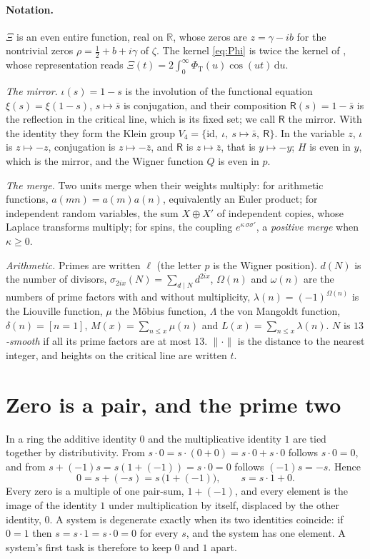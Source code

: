 \documentclass[11pt]{article}
\theoremstyle{definition}\newtheorem{definition}[theorem]{Definition}
\theoremstyle{remark}\newtheorem{remark}[theorem]{Remark}
\newcommand{\R}{\mathbb R}\newcommand{\C}{\mathbb C}\newcommand{\N}{\mathbb N}
\newcommand{\dd}{\,\mathrm d}\newcommand{\e}{\mathrm e}
\begin{document}
\paragraph{Notation.} $\Xi$ is an even entire function, real on $\R$, whose zeros are $z=\gamma-ib$ for the nontrivial zeros $\rho=\frac12+b+i\gamma$ of $\zeta$. The kernel \eqref{eq:Phi} is twice the kernel of \cite[(2.16.1)]{Titchmarsh}, whose representation reads $\Xi(t)=2\int_0^\infty\Phi_{\mathrm T}(u)\cos(ut)\dd u$.

\emph{The mirror.} $\iota(s)=1-s$ is the involution of the functional equation $\xi(s)=\xi(1-s)$, $s\mapsto\bar s$ is conjugation, and their composition $\mathsf R(s)=1-\bar s$ is the reflection in the critical line, which is its fixed set; we call $\mathsf R$ the mirror. With the identity they form the Klein group $V_4=\{\mathrm{id},\ \iota,\ s\mapsto\bar s,\ \mathsf R\}$. In the variable $z$, $\iota$ is $z\mapsto-z$, conjugation is $z\mapsto-\bar z$, and $\mathsf R$ is $z\mapsto\bar z$, that is $y\mapsto-y$; $H$ is even in $y$, which is the mirror, and the Wigner function $Q$ is even in $p$.

\emph{The merge.} Two units merge when their weights multiply: for arithmetic functions, $a(mn)=a(m)a(n)$, equivalently an Euler product; for independent random variables, the sum $X\oplus X'$ of independent copies, whose Laplace transforms multiply; for spins, the coupling $e^{\kappa\,\sigma\sigma'}$, a \emph{positive merge} when $\kappa\ge0$.

\emph{Arithmetic.} Primes are written $\ell$ (the letter $p$ is the Wigner position). $d(N)$ is the number of divisors, $\sigma_{2ix}(N)=\sum_{d\mid N}d^{2ix}$, $\Omega(n)$ and $\omega(n)$ are the numbers of prime factors with and without multiplicity, $\lambda(n)=(-1)^{\Omega(n)}$ is the Liouville function, $\mu$ the M\"obius function, $\Lambda$ the von Mangoldt function, $\delta(n)=[n=1]$, $M(x)=\sum_{n\le x}\mu(n)$ and $L(x)=\sum_{n\le x}\lambda(n)$. $N$ is \emph{$13$-smooth} if all its prime factors are at most $13$. $\|\cdot\|$ is the distance to the nearest integer, and heights on the critical line are written $t$.

\section{Zero is a pair, and the prime two}\label{sec:zero}

In a ring the additive identity $0$ and the multiplicative identity $1$ are tied together by distributivity. From $s\cdot0=s\cdot(0+0)=s\cdot0+s\cdot0$ follows $s\cdot0=0$, and from $s+(-1)s=s(1+(-1))=s\cdot0=0$ follows $(-1)s=-s$. Hence
\begin{equation}\label{eq:zero}
0=s+(-s)=s\,\bigl(1+(-1)\bigr),\qquad s=s\cdot1+0 .
\end{equation}
Every zero is a multiple of one pair-sum, $1+(-1)$, and every element is the image of the identity $1$ under multiplication by itself, displaced by the other identity, $0$. A system is degenerate exactly when its two identities coincide: if $0=1$ then $s=s\cdot1=s\cdot0=0$ for every $s$, and the system has one element. A system's first task is therefore to keep $0$ and $1$ apart.
\end{document}
